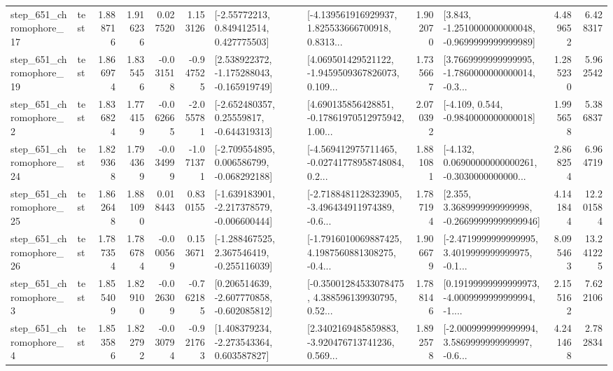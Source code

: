 \begin{tabular}{llrrrrllrlrr}
  step\_651\_chromophore\_17 &      test &      1.888716 &    1.916236 &      0.027520 &  1.153126 &     [-2.55772213, 0.849412514, 0.427775503] &  [-4.139561916929937, 1.825533666700918, 0.8313... &       1.902070 &  [3.843, -1.2510000000000048, -0.9699999999999989] &            4.489652 &          6.428317 \\
  step\_651\_chromophore\_19 &      test &      1.866974 &    1.835456 &     -0.031518 & -0.947525 &   [2.538922372, -1.175288043, -0.165919749] &  [4.069501429521122, -1.9459509367826073, 0.109... &       1.735667 &  [3.7669999999999995, -1.7860000000000014, -0.3... &            1.285230 &          5.962542 \\
   step\_651\_chromophore\_2 &      test &      1.836824 &    1.774159 &     -0.062665 & -2.055781 &    [-2.652480357, 0.25559817, -0.644319313] &  [4.690135856428851, -0.17861970512975942, 1.00... &       2.070392 &               [-4.109, 0.544, -0.9840000000000018] &            1.995658 &          5.386837 \\
  step\_651\_chromophore\_24 &      test &      1.829368 &    1.794369 &     -0.034999 & -1.071371 &   [-2.709554895, 0.006586799, -0.068292188] &  [-4.569412975711465, -0.02741778958748084, 0.2... &       1.881081 &  [-4.132, 0.06900000000000261, -0.3030000000000... &            2.868254 &          6.964719 \\
  step\_651\_chromophore\_25 &      test &      1.862648 &    1.881090 &      0.018443 &  0.830155 &  [-1.639183901, -2.217378579, -0.006600444] &  [-2.7188481128323905, -3.496434911974389, -0.6... &       1.787194 &  [2.355, 3.3689999999999998, -0.26699999999999946] &            4.141844 &         12.201584 \\
  step\_651\_chromophore\_26 &      test &      1.787354 &    1.786784 &     -0.000569 &  0.153671 &   [-1.288467525, 2.367546419, -0.255116039] &  [-1.7916010069887425, 4.1987560881308275, -0.4... &       1.906679 &  [-2.4719999999999995, 3.4019999999999975, -0.1... &            8.095463 &         13.241225 \\
   step\_651\_chromophore\_3 &      test &      1.855409 &    1.829100 &     -0.026309 & -0.762185 &   [0.206514639, -2.607770858, -0.602085812] &  [-0.35001284533078475, 4.388596139930795, 0.52... &       1.788146 &  [0.19199999999999973, -4.0009999999999994, -1.... &            2.155162 &          7.622106 \\
   step\_651\_chromophore\_4 &      test &      1.853586 &    1.822792 &     -0.030794 & -0.921763 &    [1.408379234, -2.273543364, 0.603587827] &  [2.3402169485859883, -3.920476713741236, 0.569... &       1.892578 &  [-2.0009999999999994, 3.5869999999999997, -0.6... &            4.241468 &          2.782834 \\

\end{tabular}
